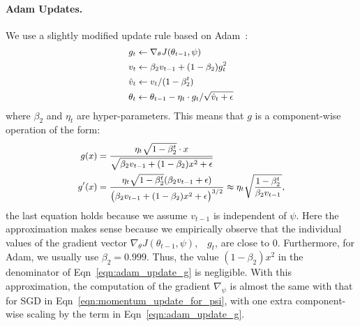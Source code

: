 \paragraph{Adam Updates.} We use a slightly modified update rule based on Adam~\citep{adam}:
\begin{equation}
  \label{eqn:adam_update}
   \small
  \begin{aligned}
    &g_t \leftarrow \nabla_\theta J(\theta_{t-1}, \psi) \\
    &v_t \leftarrow \beta_2 v_{t-1} + (1 - \beta_2) g_t^2 \\
    &\hat{v}_t \leftarrow v_t / (1 - \beta_2^t) \\
    &\theta_t \leftarrow \theta_{t-1} - \eta_t \cdot g_t / \sqrt{\hat{v}_t + \epsilon}
  \end{aligned}
\end{equation}
where $\beta_2$ and $\eta_t$ are hyper-parameters. This means that $g$ is a component-wise operation of the form:
\begin{equation}
  \label{eqn:adam_update_g}
   \small
  \begin{aligned}
    g(x) &= \frac{\eta_t \sqrt{1 - \beta_2^t} \cdot x}{\sqrt{\beta_2 v_{t-1} + (1 - \beta_2) x^2 + \epsilon}} \\
    g'(x) &= \frac{\eta_t \sqrt{1 - \beta_2^t} (\beta_2 v_{t-1} + \epsilon)}{\big( \beta_2 v_{t-1} + (1 - \beta_2) x^2 + \epsilon \big)^{3/2}} \approx \eta_t \sqrt{\frac{1 - \beta_2^t}{\beta_2 v_{t-1}}},  
  \end{aligned}
\end{equation}
the last equation holds because we assume $v_{t-1}$ is independent of $\psi$. Here the approximation makes sense because we empirically observe that the individual values of the gradient vector $\nabla_\theta J(\theta_{t-1}, \psi)$,~\ie~$g_t$, are close to $0$. Furthermore, for Adam, we usually use $\beta_2 = 0.999$. Thus, the value $(1 - \beta_2) x^2$ in the denominator of Eqn~\ref{eqn:adam_update_g} is negligible. With this approximation, the computation of the gradient $\nabla_\psi$ is almost the same with that for SGD in Eqn~\ref{eqn:momentum_update_for_psi}, with one extra component-wise scaling by the term in Eqn~\ref{eqn:adam_update_g}.
